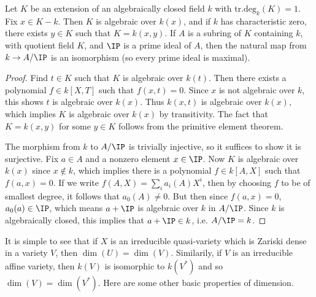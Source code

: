 \begin{lemma}
    Let $K$ be an extension of an algebraically closed field $k$ with $\text{tr.deg}_k(K) = 1$. Fix $x \in K - k$. Then $K$ is algebraic over $k(x)$, and if $k$ has characteristic zero, there exists $y \in K$ such that $K = k(x,y)$. If $A$ is a subring of $K$ containing $k$, with quotient field $K$, and $\IP$ is a prime ideal of $A$, then the natural map from $k \to A/\IP$ is an isomorphism (so every prime ideal is maximal).
\end{lemma}
\begin{proof}
    Find $t \in K$ such that $K$ is algebraic over $k(t)$. Then there exists a polynomial $f \in k[X,T]$ such that $f(x,t) = 0$. Since $x$ is not algebraic over $k$, this shows $t$ is algebraic over $k(x)$. Thus $k(x,t)$ is algebraic over $k(x)$, which implies $K$ is algebraic over $k(x)$ by transitivity. The fact that $K = k(x,y)$ for some $y \in K$ follows from the primitive element theorem.

    The morphism from $k$ to $A/\IP$ is trivially injective, so it suffices to show it is surjective. Fix $a \in A$ and a nonzero element $x \in \IP$. Now $K$ is algebraic over $k(x)$ since $x \not \in k$, which implies there is a polynomial $f \in k[A,X]$ such that $f(a,x) = 0$. If we write $f(A,X) = \sum_i a_i(A) X^i$, then by choosing $f$ to be of smallest degree, it follows that $a_0(A) \neq 0$. But then since $f(a,x) = 0$, $a_0(a) \in \IP$, which means $a + \IP$ is algebraic over $k$ in $A/\IP$. Since $k$ is algebraically closed, this implies that $a + \IP \in k$, i.e. $A/\IP = k$.
\end{proof}

It is simple to see that if $X$ is an irreducible quasi-variety which is Zariski dense in a variety $V$, then $\dim(U) = \dim(V)$. Similarily, if $V$ is an irreducible affine variety, then $k(V)$ is isomorphic to $k(V^*)$ and so $\dim(V) = \dim(V^*)$. Here are some other basic properties of dimension.

